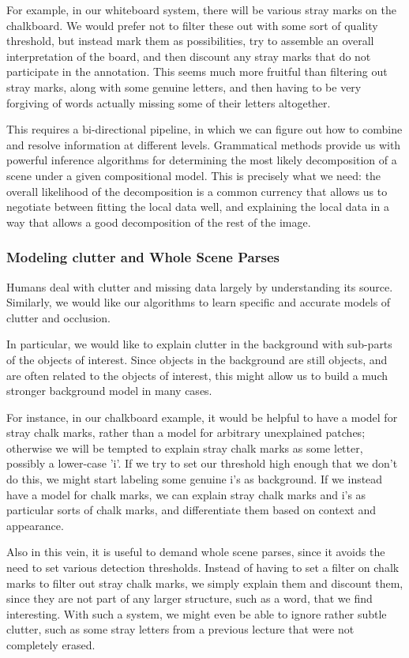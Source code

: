 \documentclass{article}
\begin{document}
For example, in our whiteboard system, there will be various stray
marks on the chalkboard. We would prefer not to filter these out with
some sort of quality threshold, but instead mark them as
possibilities, try to assemble an overall interpretation of the board,
and then discount any stray marks that do not participate in the
annotation. This seems much more fruitful than filtering out stray
marks, along with some genuine letters, and then having to be very
forgiving of words actually missing some of their letters altogether.

This requires a bi-directional pipeline, in which we can figure out
how to combine and resolve information at different levels.
Grammatical methods provide us with powerful inference algorithms for
determining the most likely decomposition of a scene under a given
compositional model. This is precisely what we need: the overall
likelihood of the decomposition is a common currency that allows us to
negotiate between fitting the local data well, and explaining the
local data in a way that allows a good decomposition of the rest of
the image.

\subsubsection{Modeling clutter and Whole Scene Parses}

Humans deal with clutter and missing data largely by understanding its
source. Similarly, we would like our algorithms to learn specific and
accurate models of clutter and occlusion.

In particular, we would like to explain clutter in the background with
sub-parts of the objects of interest. Since objects in the background
are still objects, and are often related to the objects of interest,
this might allow us to build a much stronger background model in many
cases.

For instance, in our chalkboard example, it would be helpful to have a
model for stray chalk marks, rather than a model for arbitrary
unexplained patches; otherwise we will be tempted to explain stray
chalk marks as some letter, possibly a lower-case 'i'. If we try to
set our threshold high enough that we don't do this, we might start
labeling some genuine i's as background. If we instead have a model
for chalk marks, we can explain stray chalk marks and i's as
particular sorts of chalk marks, and differentiate them based on
context and appearance.

Also in this vein, it is useful to demand whole scene parses, since it
avoids the need to set various detection thresholds. Instead of having
to set a filter on chalk marks to filter out stray chalk marks, we
simply explain them and discount them, since they are not part of any
larger structure, such as a word, that we find interesting.  With such
a system, we might even be able to ignore rather subtle clutter, such
as some stray letters from a previous lecture that were not completely
erased.
\end{document}
